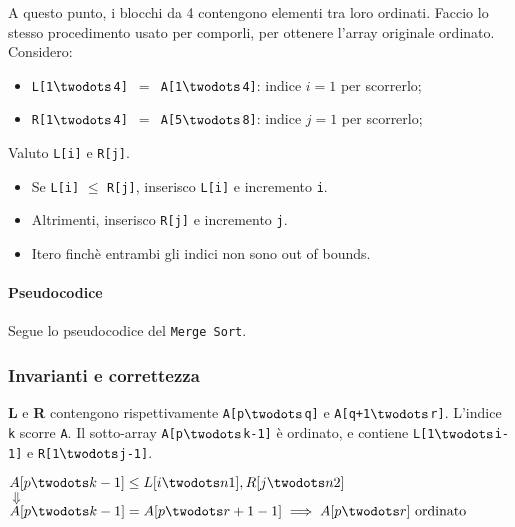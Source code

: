 A questo punto, i blocchi da 4 contengono elementi tra loro ordinati. Faccio lo stesso procedimento
usato per comporli, per ottenere l'array originale ordinato. Considero:
\begin{itemize}[noitemsep]
    \item \texttt{L[1$\twodots$4] $=$ A[1$\twodots$4]}: indice $i = 1$ per scorrerlo;
    \item \texttt{R[1$\twodots$4] $=$ A[5$\twodots$8]}: indice $j = 1$ per scorrerlo;
\end{itemize}

Valuto \texttt{L[i]} e \texttt{R[j]}. \par
\begin{itemize}[noitemsep]
    \item Se \texttt{L[i]} $\leq$ \texttt{R[j]}, inserisco \texttt{L[i]} e incremento \texttt{i}. \par
    \item Altrimenti, inserisco \texttt{R[j]} e incremento \texttt{j}.
    \item Itero finchè entrambi gli indici non sono out of bounds.
\end{itemize}

\paragraph{Pseudocodice} Segue lo pseudocodice del 
\texttt{Merge Sort}.





\subsubsection{Invarianti e correttezza}

\textbf{L} e \textbf{R} contengono rispettivamente 
\texttt{A[p$\twodots$q]} e \texttt{A[q+1$\twodots$r]}. 
L'indice \texttt{k} scorre \texttt{A}. Il sotto-array \texttt{A[p$\twodots$k-1]}
è ordinato, e contiene \texttt{L[1$\twodots$i-1]} e \texttt{R[1$\twodots$j-1]}.

\begin{center}
    $A[p \twodots k-1] \leq L[i \twodots n1], R[j \twodots n2]$ \\
    $\Downarrow$ \\
    $A[p \twodots k-1] = A[p \twodots r+1-1] \implies A[p \twodots r] \text{ ordinato}$
\end{center}

